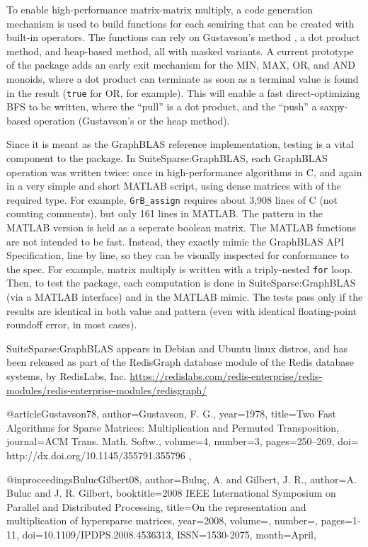To enable high-performance matrix-matrix multiply, a code generation mechanism
is used to build functions for each semiring that can be created with built-in
operators.  The functions can rely on Gustavson's method \cite{Gustavson78}, a
dot product method, and heap-based method, all with masked variants.  A current
prototype of the package adds an early exit mechanism for the MIN, MAX, OR, and
AND monoids, where a dot product can terminate as soon as a terminal value is
found in the result (\verb'true' for OR, for example).  This will enable a fast
direct-optimizing BFS to be written, where the ``pull'' is a dot product, and
the ``push'' a saxpy-based operation (Gustavson's or the heap method).

Since it is meant as the GraphBLAS reference implementation, testing is a vital
component to the package.  In SuiteSparse:GraphBLAS, each GraphBLAS operation
was written twice: once in high-performance algorithms in C, and again in a
very simple and short MATLAB script, using dense matrices with of the required
type.  For example, \verb'GrB_assign' requires about 3,908 lines of C (not
counting comments), but only 161 lines in MATLAB.  The pattern in the MATLAB
version is held as a seperate boolean matrix.  The MATLAB functions are not
intended to be fast.  Instead, they exactly mimic the GraphBLAS API
Specification, line by line, so they can be visually inspected for conformance
to the spec.  For example, matrix multiply is written with a triply-nested
\verb'for' loop.  Then, to test the package, each computation is done in
SuiteSparse:GraphBLAS (via a MATLAB interface) and in the MATLAB mimic.  The
tests pass only if the results are identical in both value and pattern (even
with identical floating-point roundoff error, in most cases).

SuiteSparse:GraphBLAS appears in Debian and Ubuntu linux distros,
and has been released as part of the RedisGraph database
module of the Redis database systems, by RedisLabs, Inc.
\url{https://redislabs.com/redis-enterprise/redis-modules/redis-enterprise-modules/redisgraph/}


@article{Gustavson78,
        author={Gustavson, F. G.},
        year={1978},
        title={Two Fast Algorithms for Sparse Matrices: Multiplication and Permuted Transposition},
        journal={ACM Trans. Math. Softw.},
        volume={4},
        number={3},
        pages={250--269},
        doi={ http://dx.doi.org/10.1145/355791.355796 }, }

@inproceedings{BulucGilbert08,
    author={Bulu\c{c}, A. and Gilbert, J. R.},
    author={A. Buluc and J. R. Gilbert}, 
    booktitle={2008 IEEE International Symposium on Parallel and Distributed Processing}, 
    title={On the representation and multiplication of hypersparse matrices}, 
    year={2008}, 
    volume={}, 
    number={}, 
    pages={1-11}, 
    doi={10.1109/IPDPS.2008.4536313}, 
    ISSN={1530-2075}, 
    month={April},}

